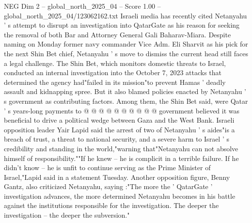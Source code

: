 \begin{textsample}{NEG Dim 2 – global\_north\_2025\_04 – Score 1.00 – global\_north\_2025\_04/123062162.txt}
Israeli media has recently cited Netanyahu ' s attempt to disrupt an investigation into QatarGate as his reason for seeking the removal of both Bar and Attorney General Gali Baharav-Miara.
Despite naming on Monday former navy commander Vice Adm.
Eli Sharvit as his pick for the next Shin Bet chief, Netanyahu ' s move to dismiss the current head still faces a legal challenge.
The Shin Bet, which monitors domestic threats to Israel, conducted an internal investigation into the October 7, 2023 attacks that determined the agency had"failed in its mission"to prevent Hamas ' deadly assault and kidnapping spree.
But it also blamed policies enacted by Netanyahu ' s government as contributing factors.
Among them, the Shin Bet said, were Qatar ' s years-long payments to @ @ @ @ @ @ @ @ @ @ government believed it was beneficial to drive a political wedge between Gaza and the West Bank.
Israeli opposition leader Yair Lapid said the arrest of two of Netanyahu ' s aides"is a breach of trust, a threat to national security, and a severe harm to Israel ' s credibility and standing in the world,"warning that"Netanyahu can not absolve himself of responsibility.""If he knew -- he is complicit in a terrible failure.
If he didn't know -- he is unfit to continue serving as the Prime Minister of Israel,"Lapid said in a statement Tuesday.
Another opposition figure, Benny Gantz, also criticized Netanyahu, saying :"The more the ' QatarGate ' investigation advances, the more determined Netanyahu becomes in his battle against the institutions responsible for the investigation.
The deeper the investigation -- the deeper the subversion."

\end{textsample}
